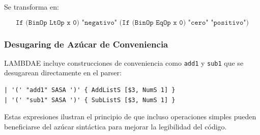 \documentclass[a4paper,12pt]{article}
\begin{document}
Se transforma en:

\begin{equation*}
\texttt{If (BinOp LtOp x 0) "negativo" (If (BinOp EqOp x 0) "cero" "positivo")}
\end{equation*}

\subsubsection{Desugaring de Azúcar de Conveniencia}

LAMBDAE incluye construcciones de conveniencia como \texttt{add1} y \texttt{sub1} que se desugarean directamente en el parser:

\begin{lstlisting}[style=haskellstyle, caption={Azúcar sintáctica de conveniencia}]
| '(' "add1" SASA ')' { AddListS [$3, NumS 1] }
| '(' "sub1" SASA ')' { SubListS [$3, NumS 1] }
\end{lstlisting}

Estas expresiones ilustran el principio de que incluso operaciones simples pueden beneficiarse del azúcar sintáctica para mejorar la legibilidad del código.
\end{document}
